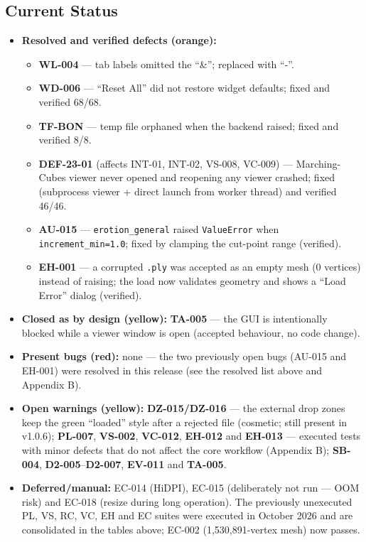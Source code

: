\documentclass[12pt,a4paper]{article}
\begin{document}
\subsection{Current Status}
\begin{itemize}
  \item \textbf{Resolved and verified defects (orange):}
        \begin{itemize}
          \item \textbf{WL-004} --- tab labels omitted the ``\&''; replaced with ``-''.
          \item \textbf{WD-006} --- ``Reset All'' did not restore widget defaults; fixed and verified 68/68.
          \item \textbf{TF-BON} --- temp file orphaned when the backend raised; fixed and verified 8/8.
          \item \textbf{DEF-23-01} (affects INT-01, INT-02, VS-008, VC-009) --- Marching-Cubes viewer
                never opened and reopening any viewer crashed; fixed (subprocess viewer + direct launch
                from worker thread) and verified 46/46.
          \item \textbf{AU-015} --- \texttt{erotion\_general} raised \texttt{ValueError}
                when \texttt{increment\_min=1.0}; fixed by clamping the cut-point range (verified).
          \item \textbf{EH-001} --- a corrupted \texttt{.ply} was accepted as an empty mesh
                (0 vertices) instead of raising; the load now validates geometry and shows a
                ``Load Error'' dialog (verified).
        \end{itemize}
  \item \textbf{Closed as by design (yellow):} \textbf{TA-005} --- the GUI is intentionally blocked
        while a viewer window is open (accepted behaviour, no code change).
  \item \textbf{Present bugs (red):} none --- the two previously open bugs (AU-015 and EH-001)
        were resolved in this release (see the resolved list above and Appendix B).
  \item \textbf{Open warnings (yellow):} \textbf{DZ-015/DZ-016} --- the external drop zones keep the
        green ``loaded'' style after a rejected file (cosmetic; still present in v1.0.6);
        \textbf{PL-007}, \textbf{VS-002}, \textbf{VC-012}, \textbf{EH-012} and \textbf{EH-013} ---
        executed tests with minor defects that do not affect the core workflow (Appendix B);
        \textbf{SB-004}, \textbf{D2-005}--\textbf{D2-007}, \textbf{EV-011} and \textbf{TA-005}.
  \item \textbf{Deferred/manual:} EC-014 (HiDPI), EC-015 (deliberately not run --- OOM risk) and
        EC-018 (resize during long operation). The previously unexecuted PL, VS, RC, VC, EH and EC
        suites were executed in October 2026 and are consolidated in the tables above; EC-002
        (1,530,891-vertex mesh) now passes.
\end{itemize}
\end{document}
